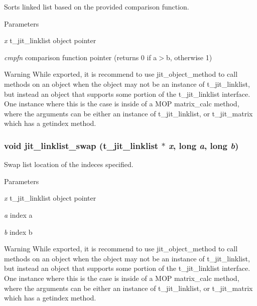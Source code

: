Sorts linked list based on the provided comparison function. 
\begin{DoxyParams}{Parameters}
\item[{\em x}]t\_\-jit\_\-linklist object pointer \item[{\em cmpfn}]comparison function pointer (returns 0 if a$>$b, otherwise 1)\end{DoxyParams}
\begin{DoxyWarning}{Warning}
While exported, it is recommend to use jit\_\-object\_\-method to call methods on an object when the object may not be an instance of t\_\-jit\_\-linklist, but instead an object that supports some portion of the t\_\-jit\_\-linklist interface. One instance where this is the case is inside of a MOP matrix\_\-calc method, where the arguments can be either an instance of t\_\-jit\_\-linklist, or t\_\-jit\_\-matrix which has a getindex method. 
\end{DoxyWarning}
\hypertarget{group__linklistmod_gae989e1d64d2bba31133aa79d7107f3fc}{
\subsubsection[{jit\_\-linklist\_\-swap}]{\setlength{\rightskip}{0pt plus 5cm}void jit\_\-linklist\_\-swap (t\_\-jit\_\-linklist $\ast$ {\em x}, \/  long {\em a}, \/  long {\em b})}}
\label{group__linklistmod_gae989e1d64d2bba31133aa79d7107f3fc}


Swap list location of the indeces specified. 
\begin{DoxyParams}{Parameters}
\item[{\em x}]t\_\-jit\_\-linklist object pointer \item[{\em a}]index a \item[{\em b}]index b\end{DoxyParams}
\begin{DoxyWarning}{Warning}
While exported, it is recommend to use jit\_\-object\_\-method to call methods on an object when the object may not be an instance of t\_\-jit\_\-linklist, but instead an object that supports some portion of the t\_\-jit\_\-linklist interface. One instance where this is the case is inside of a MOP matrix\_\-calc method, where the arguments can be either an instance of t\_\-jit\_\-linklist, or t\_\-jit\_\-matrix which has a getindex method. 
\end{DoxyWarning}
